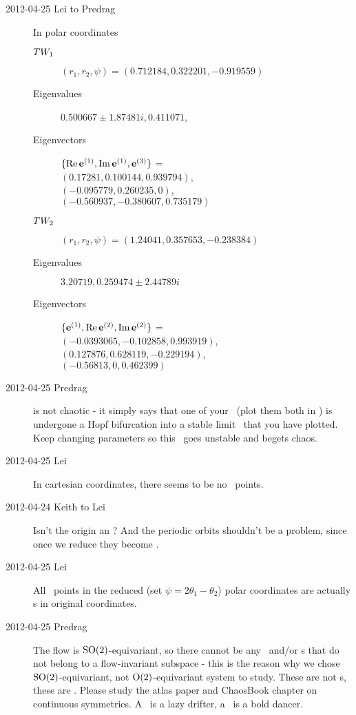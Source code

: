 \begin{description}
\item[2012-04-25 Lei to Predrag] In polar coordinates
\begin{description}
\item[$\REQV{}{1}$] $(r_1,r_2,\psi)=(0.712184,0.322201,-0.919559)$
\item[Eigenvalues] ${0.500667 \pm 1.87481i, 0.411071}$,
\item[Eigenvectors] $\{ \Re \jEigvec[1], \Im \jEigvec[1], \jEigvec[3]\}$ =\\
$(0.17281, 0.100144 , 0.939794)$,\\
$(-0.095779, 0.260235, 0)$, \\
$(-0.560937, -0.380607, 0.735179)$
\item[$\REQV{}{2}$] $(r_1,r_2,\psi)=(1.24041,0.357653,-0.238384)$
\item[Eigenvalues] ${3.20719, 0.259474 \pm 2.44789 i}$
\item[Eigenvectors]  $\{ \jEigvec[1], \Re \jEigvec[2], \Im \jEigvec[2]\}$ =\\
$(-0.0393065, -0.102858, 0.993919)$, \\
$(0.127876, 0.628119, -0.229194)$, \\
$(- 0.56813, 0, 0.462399)$
\end{description}


\item[2012-04-25 Predrag]  is not chaotic -
it simply says that one of your \reqva\ (plot them both in
) is undergone a Hopf bifurcation into a
stable limit \rpo\ that you have plotted. Keep changing parameters so
this \rpo\ goes unstable and begets chaos.

\item[2012-04-25 Lei]
In cartesian coordinates, there seems to be no \eqv\ points.

\item[2012-04-24 Keith to Lei]  Isn't the origin an \eqv?  And the
periodic orbits shouldn't be a problem, since once we reduce they become
\eqv.

\item[2012-04-25 Lei]
All \eqva\ points in the reduced (set $\psi=2\theta_1-\theta_2$)
polar coordinates are actually \po s in original coordinates.

\item[2012-04-25 Predrag]  The flow is $\SOn{2}$-equivariant, so there
cannot be any \eqva\ and/or \po s that do not belong to a flow-invariant
subspace - this is {\color{red} the reason why we chose}
$\SOn{2}$-equivariant, not $\On{2}$-equivariant system to study. These
are {\color{red} not} \po s, these are \reqva. Please study the atlas
paper and ChaosBook chapter on continuous symmetries. A \reqv\ is a lazy
drifter, a \rpo\ is a bold dancer.


\end{description}
